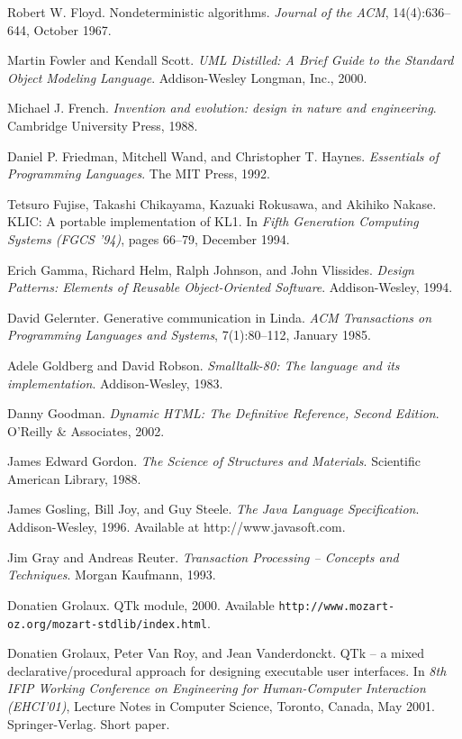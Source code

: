 \begin{thebibliography}{213}
Robert W. Floyd. Nondeterministic algorithms. \emph{Journal of the ACM}, 14(4):636–644, October 1967.

Martin Fowler and Kendall Scott. \emph{UML Distilled: A Brief Guide to the Standard Object Modeling Language}. Addison-Wesley Longman, Inc., 2000.

Michael J. French. \emph{Invention and evolution: design in nature and engineering}. Cambridge University Press, 1988.

Daniel P. Friedman, Mitchell Wand, and Christopher T. Haynes. \emph{Essentials of Programming Languages}. The MIT Press, 1992.

Tetsuro Fujise, Takashi Chikayama, Kazuaki Rokusawa, and Akihiko Nakase. KLIC: A portable implementation of KL1. In \emph{Fifth Generation Computing Systems (FGCS ’94)}, pages 66–79, December 1994.

Erich Gamma, Richard Helm, Ralph Johnson, and John Vlissides. \emph{Design Patterns: Elements of Reusable Object-Oriented Software}. Addison-Wesley, 1994.

David Gelernter. Generative communication in Linda. \emph{ACM Transactions on Programming Languages and Systems}, 7(1):80–112, January 1985.

Adele Goldberg and David Robson. \emph{Smalltalk-80: The language and its implementation}. Addison-Wesley, 1983.

Danny Goodman. \emph{Dynamic HTML: The Definitive Reference, Second Edition}. O’Reilly \& Associates, 2002.

James Edward Gordon. \emph{The Science of Structures and Materials}. Scientific American Library, 1988.

James Gosling, Bill Joy, and Guy Steele. \emph{The Java Language Specification}. Addison-Wesley, 1996. Available at http://www.javasoft.com.

Jim Gray and Andreas Reuter. \emph{Transaction Processing – Concepts and Techniques}. Morgan Kaufmann, 1993.

Donatien Grolaux. QTk module, 2000. Available \verb"http://www.mozart-oz.org/mozart-stdlib/index.html".

Donatien Grolaux, Peter Van Roy, and Jean Vanderdonckt. QTk – a mixed declarative/procedural approach for designing executable user interfaces. In \emph{8th IFIP Working Conference on Engineering for Human-Computer Interaction (EHCI’01)}, Lecture Notes in Computer Science, Toronto, Canada, May 2001. Springer-Verlag. Short paper.


\end{thebibliography}
